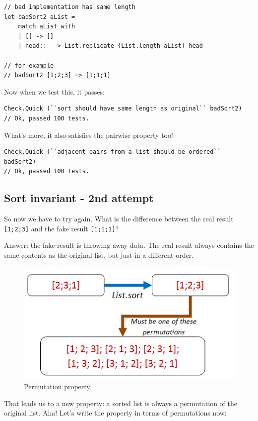 \begin{verbatim}
// bad implementation has same length
let badSort2 aList = 
	match aList with 
	| [] -> []
	| head::_ -> List.replicate (List.length aList) head 

// for example 
// badSort2 [1;2;3] => [1;1;1]
\end{verbatim}
Now when we test this, it passes:

\begin{verbatim}
Check.Quick (``sort should have same length as original`` badSort2)
// Ok, passed 100 tests.
\end{verbatim}
What's more, it also satisfies the pairwise property too!

\begin{verbatim}
Check.Quick (``adjacent pairs from a list should be ordered`` badSort2)
// Ok, passed 100 tests.
\end{verbatim}


\subsection{Sort invariant - 2nd
attempt}\label{sort-invariant---2nd-attempt}

So now we have to try again. What is the difference between the real
result \texttt{{[}1;2;3{]}} and the fake result \texttt{{[}1;1;1{]}}?

Answer: the fake result is throwing away data. The real result always
contains the same contents as the original list, but just in a different
order.

\begin{figure}[htbp]
\centering
\includegraphics{pics/property_list_sort_permutation.png}
\caption{Permutation property}
\end{figure}

That leads us to a new property: a sorted list is always a permutation
of the original list. Aha! Let's write the property in terms of
permutations now:

